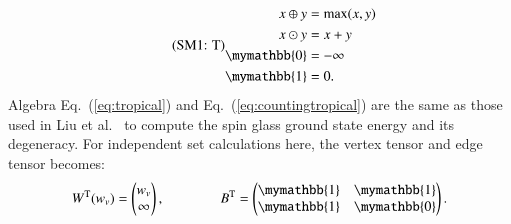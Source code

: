 \documentclass[onefignum, onetabnum]{siamart190516}
\newcommand{\eqname}[1]{\stepcounter{equation}\tag{\theequation : #1}}
\newcommand{\<}{\langle}
\renewcommand{\>}{\rangle}
\newcommand{\Eq}[1]{Eq.~(\ref{#1})}
\begin{document}
\begin{equation}\eqname{T}
    \begin{split}
        x \oplus y &= \max(x,y)\\
        x \odot y &= x + y\\
        \mymathbb{0} &= -\infty\\
        \mymathbb{1} &= 0.
    \end{split}\label{eq:tropical}
\end{equation}
Algebra \Eq{eq:tropical} and \Eq{eq:countingtropical} are the same as those used in Liu et al.~\cite{Liu2021} to compute the spin glass ground state energy and its degeneracy.
For independent set calculations here, the vertex tensor and edge tensor becomes:
\begin{equation}
    W^{\rm T}(w_v) = \left(\begin{matrix}
        w_v \\
        \infty
    \end{matrix}\right),   
    \qquad \qquad
        B^{\rm T} = \left(\begin{matrix}
        \mymathbb{1}  & \mymathbb{1} \\
        \mymathbb{1} & \mymathbb{0}
    \end{matrix}\right).
\end{equation}
\end{document}
